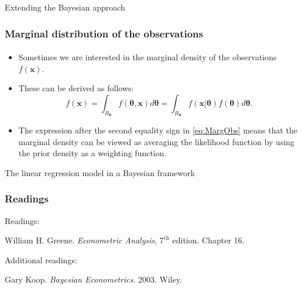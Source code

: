 \documentclass[10pt]{beamer}
\theoremstyle{definition}
\begin{document}
\begin{section}{Extending the Bayesian approach}
\begin{frame}[fragile]
\frametitle{Marginal distribution of the observations}
\framesubtitle{}
\begin{itemize}\itemsep1em
\item Sometimes we are interested in the marginal density of the observations $f(\mathbf{x})$.
\item These can be derived as follows:
\begin{equation}
\label{eq:MargObs}f(\mathbf{x})=\int_{R_{\boldsymbol{\theta}}}f(\boldsymbol{\theta},\mathbf{x})d\boldsymbol{\theta}=\int_{R_{\boldsymbol{\theta}}}f(\mathbf{x}|\boldsymbol{\theta})f(\boldsymbol{\theta})d\boldsymbol{\theta}.
\end{equation}
\item The expression after the second equality sign in \eqref{eq:MargObs} means that the marginal density can be viewed as averaging the likelihood function by using the prior density as a weighting function.
\end{itemize}
\end{frame}











\end{section}

\begin{section}{The linear regression model in a Bayesian framework}\label{sec:BayesLM}

\end{section}


\begin{frame}[fragile]
\frametitle{Readings}
Readings:\bigskip

William H. Greene. \emph{Econometric Analysis}, $ 7^{\text{th}} $ edition. Chapter 16.\bigskip

Additional readings:\bigskip

Gary Koop. \emph{Bayesian Econometrics}. 2003. Wiley.
\end{frame}
\end{document}
